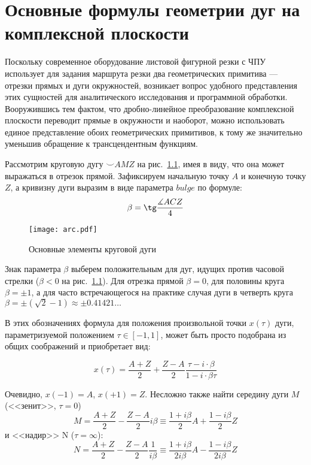 
\chapter{%
  Основные формулы геометрии дуг на комплексной плоскости
}
\label{app:bulge}

Поскольку современное оборудование листовой фигурной резки с ЧПУ
использует для задания маршрута резки два геометрических примитива ---
отрезки прямых и дуги окружностей,
возникает вопрос удобного представления этих сущностей
для аналитического исследования и программной обработки.
Вооружившись тем фактом,
что дробно-линейное преобразование комплексной плоскости
переводит прямые в окружности и наоборот,
можно использовать единое представление обоих
геометрических примитивов,
к тому же значительно уменьшив обращение
к трансцендентным функциям.

Рассмотрим круговую дугу
${\smile}AMZ$
на рис.~\ref{fig:app.arc},
имея в виду,
что она может выражаться в отрезок прямой.
Зафиксируем начальную точку $A$
и конечную точку $Z$,
а кривизну дуги выразим в виде параметра
$bulge$
по формуле:
\begin{equation}
  \beta = \tg \frac{\measuredangle ACZ}{4}
\end{equation}

\begin{figure}
  \centering
  \texttt{[image: arc.pdf]}
  \caption{Основные элементы круговой дуги}
  \label{fig:app.arc}
\end{figure}

Знак параметра $\beta$
выберем положительным для дуг,
идущих против часовой стрелки
($\beta < 0$ на рис.~\ref{fig:app.arc}).
Для отрезка прямой
$\beta=0$,
для половины круга
$\beta = \pm 1$,
а для часто встречающегося на практике
случая дуги в четверть круга
$\beta = \pm(\sqrt{2}-1)\approx \pm 0.41421 \dots$

В этих обозначениях формула для положения
произвольной точки
$x(\tau)$ дуги,
параметризуемой положением
$\tau \in[-1,1]$,
может быть просто подобрана из общих соображений
и приобретает вид:

\begin{equation}
  \label{eq:bulge.x}
  x(\tau) =
  \frac{A+Z}{2} + \frac{Z-A}{2}\frac{\tau - i \cdot \beta}{1 - i \cdot \beta \tau}
\end{equation}

Очевидно,
$x(-1) = A$,
$x(+1) = Z$.
Несложно также найти середину дуги
$M$
(<<зенит>>,
$\tau=0$)
$$
M = \frac{A+Z}{2} - \frac{Z-A}{2}i\beta
\equiv
\frac{1+i \beta}2 A + \frac{1-i \beta}2 Z
$$
и <<надир>> N
($\tau=\infty$):
$$
N = \frac{A+Z}{2} - \frac{Z-A}{2} \frac{1}{i\beta}
\equiv
\frac{1+i \beta}{2 i \beta} A - \frac{1 - i \beta}{2 i\beta} Z
$$

